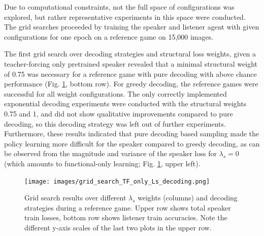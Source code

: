 Due to computational constraints, not the full space of configurations was explored, but rather representative experiments in this space were conducted. The grid searches proceeded by training the speaker and listener agent with given configurations for one epoch on a reference game on 15,000 images. 

The first grid search over decoding strategies and structural loss weights, given a teacher-forcing only pretrained speaker revealed that a minimal structural weight of 0.75 was necessary for a reference game with pure decoding with above chance performance (Fig. \ref{fig:coco_grid_Ls_decoding_TF_only}, bottom row). For greedy decoding, the reference games were successful for all weight configurations. The only correctly implemented exponential decoding experiments were conducted with the structural weights 0.75 and 1, and did not show qualitative improvements compared to pure decoding, so this decoding strategy was left out of further experiments. Furthermore, these results indicated that pure decoding based sampling made the policy learning more difficult for the speaker compared to greedy decoding, as can be observed from the magnitude and variance of the speaker loss for $\lambda_s = 0$ (which amounts to functional-only learning; Fig. \ref{fig:coco_grid_Ls_decoding_TF_only}, upper left).

\begin{figure}[h]
	\centering
	\texttt{[image: images/grid\_search\_TF\_only\_Ls\_decoding.png]}
	\caption{Grid search results over different $\lambda_s$ weights (columns) and decoding strategies during a reference game. Upper row shows total speaker train losses, bottom row shows listener train accuracies. Note the different y-axis scales of the last two plots in the upper row.}
	\label{fig:coco_grid_Ls_decoding_TF_only}
\end{figure}

